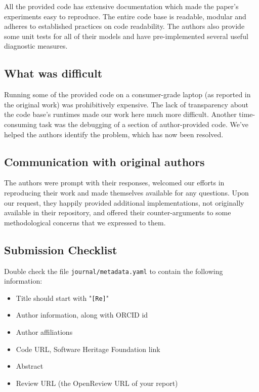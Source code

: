 All the provided code has extensive documentation which made the paper's experiments easy to reproduce. The entire code base is readable, modular and adheres to established practices on code readability. The authors also provide some unit tests for all of their models and have pre-implemented several useful diagnostic measures.


\subsection{What was difficult}


Running some of the provided code on a consumer-grade laptop (as reported in the original work) was prohibitively expensive. The lack of transparency about the code base's runtimes made our work here much more difficult. Another time-consuming task was the debugging of a section of author-provided code. We've helped the authors identify the problem, which has now been resolved.

\subsection{Communication with original authors}

The authors were prompt with their responses, welcomed our efforts in reproducing their work and made themselves available for any questions. Upon our request, they happily provided additional implementations, not originally available in their repository, and offered their counter-arguments to some methodological concerns that we expressed to them.
\newpage
\subsection{Submission Checklist}

Double check the file \texttt{journal/metadata.yaml} to contain the following information:

\begin{itemize}
\item Title should start with "\texttt{[Re]}"
\item Author information, along with ORCID id
\item Author affiliations
\item Code URL, Software Heritage Foundation link
\item Abstract
\item Review URL (the OpenReview URL of your report)
\end{itemize}


